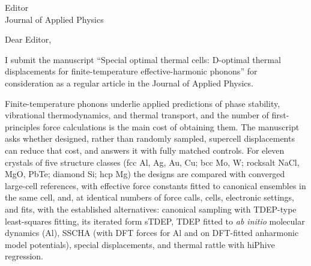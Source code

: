 \documentclass[11pt]{letter}
\begin{document}
\begin{letter}{Editor\\Journal of Applied Physics}
\opening{Dear Editor,}

I submit the manuscript ``Special optimal thermal cells: D-optimal thermal
displacements for finite-temperature effective-harmonic phonons'' for
consideration as a regular article in the Journal of Applied Physics.

Finite-temperature phonons underlie applied predictions of phase stability,
vibrational thermodynamics, and thermal transport, and the number of
first-principles force calculations is the main cost of obtaining them. The
manuscript asks whether designed, rather than randomly sampled, supercell
displacements can reduce that cost, and answers it with fully matched
controls. For eleven crystals of five structure classes (fcc Al, Ag, Au, Cu;
bcc Mo, W; rocksalt NaCl, MgO, PbTe; diamond Si; hcp Mg) the designs are
compared with converged large-cell references, with effective force
constants fitted to canonical ensembles in the same cell, and, at identical
numbers of force calls, cells, electronic settings, and fits, with the
established alternatives: canonical sampling with TDEP-type least-squares
fitting, its iterated form sTDEP, TDEP fitted to \textit{ab initio} molecular
dynamics (Al), SSCHA (with DFT forces for Al and on DFT-fitted anharmonic model
potentials), special displacements, and thermal rattle with hiPhive regression.


\end{letter}
\end{document}

